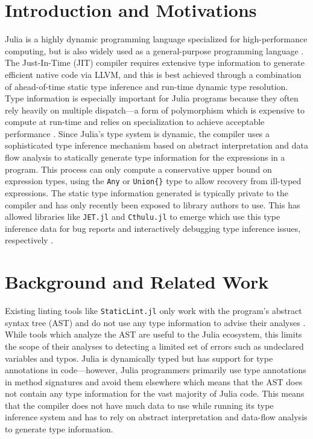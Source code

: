 \documentclass[manuscript, nonacm]{acmart}
\begin{document}
\section{Introduction and Motivations}
Julia is a highly dynamic programming language specialized for high-performance computing, but is also widely used as a general-purpose programming language \cite{julia17}. The Just-In-Time (JIT) compiler requires extensive type information to generate efficient native code via LLVM, and this is best achieved through a combination of ahead-of-time static type inference and run-time dynamic type resolution. Type information is especially important for Julia programs because they often rely heavily on multiple dispatch---a form of polymorphism which is expensive to compute at run-time and relies on specialization to achieve acceptable performance \cite{julia17}. Since Julia's type system is dynamic, the compiler uses a sophisticated type inference mechanism based on abstract interpretation and data flow analysis to statically generate type information for the expressions in a program. This process can only compute a conservative upper bound on expression types, using the \texttt{Any} or \verb|Union{}| type to allow recovery from ill-typed expressions. The static type information generated is typically private to the compiler and has only recently been exposed to library authors to use. This has allowed libraries like \texttt{JET.jl} and \texttt{Cthulu.jl} to emerge which use this type inference data for bug reports and interactively debugging type inference issues, respectively \cite{jet, cthulu}.

\section{Background and Related Work}
Existing linting tools like \texttt{StaticLint.jl} only work with the program's abstract syntax tree (AST) and do not use any type information to advise their analyses \cite{staticlint}. While tools which analyze the AST are useful to the Julia ecosystem, this limits the scope of their analyses to detecting a limited set of errors such as undeclared variables and typos. Julia is dynamically typed but has support for type annotations in code---however, Julia programmers primarily use type annotations in method signatures and avoid them elsewhere which means that the AST does not contain any type information for the vast majority of Julia code. This means that the compiler does not have much data to use while running its type inference system and has to rely on abstract interpretation and data-flow analysis to generate type information.
\end{document}
